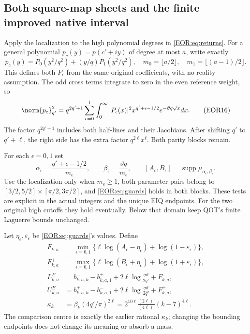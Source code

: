\documentclass[11pt,a4paper]{article}
\begin{document}
\subsection{Both square-map sheets and the finite improved native interval}
\label{EOR:sec:application}
Apply the localization to the high polynomial degrees in \eqref{EOR:eq:returns}.
For a general polynomial $p_c(y)=p(c'+iy)$ of degree at most $a$, write exactly
\begin{equation}
 p_c(y)=P_0(y^2/q^2)+(y/q)P_1(y^2/q^2),\quad
 m_0=\lfloor a/2\rfloor,\quad m_1=\lfloor(a-1)/2\rfloor .
 \label{EOR:eq:parity}
\tag{EOR15}
\end{equation}
This defines both $P_\epsilon$ from the same original coefficients, with no
reality assumption. The odd cross terms integrate to zero in the even reference
weight, so
\begin{equation}
 \norm{p_c}_{q'}^2=q^{2q'+1}\sum_{\epsilon=0}^1
 \int_0^\infty |P_\epsilon(x)|^2
 x^{q'+\epsilon-1/2}e^{-\vartheta q\sqrt x}dx.
 \label{EOR:eq:square}
\tag{EOR16}
\end{equation}
The factor $q^{2q'+1}$ includes both half-lines and their Jacobians.
After shifting $q'$ to $q'+\ell$, the right side has the extra factor
$q^{2\ell}x^\ell$. Both parity blocks remain.

For each $\epsilon=0,1$ set
\begin{equation}
 \alpha_\epsilon=\frac{q'+\epsilon-1/2}{m_\epsilon},\qquad
 \beta_\epsilon=\frac{\vartheta q}{m_\epsilon},\qquad
 [A_\epsilon,B_\epsilon]=\operatorname{supp}\mu_{\alpha_\epsilon,\beta_\epsilon}.
 \label{EOR:eq:parameters}
\tag{EOR17}
\end{equation}
Use the localization only when $m_\epsilon\ge1$, both parameter pairs belong to
$[3/2,5/2]\times[\pi/2,3\pi/2]$, and \eqref{EOR:eq:guards} holds in both blocks.
These tests are explicit in the actual integers and the unique EIQ endpoints.
For the two original high cutoffs they hold eventually. Below that domain keep
QOT's finite Laguerre bounds unchanged.

Let $\eta_\epsilon,\varepsilon_\epsilon$ be \eqref{EOR:eq:guards}'s values. Define
\begin{equation}
\begin{split}
 F_{k,a}^{-}&=\min_{\epsilon=0,1}
  \{\ell\log(A_\epsilon-\eta_\epsilon)+\log(1-\varepsilon_\epsilon)\},\\
 F_{k,a}^{+}&=\max_{\epsilon=0,1}
  \{\ell\log(B_\epsilon+\eta_\epsilon)+\log(1+\varepsilon_\epsilon)\},\\
 L_{k,a}^{E}&=b_{k,a,k}^{-}-b_{k,a,1}^{+}
       +2\ell\log\frac{q\vartheta}{2q'}+F_{k,a}^{-},\\
 U_{k,a}^{E}&=b_{k,a,k}^{+}-b_{k,a,1}^{-}
       +2\ell\log\frac{q\vartheta}{2q'}+F_{k,a}^{+},\\
 \kappa_k&=\beta_k(4q'/\pi)^{2\ell}
          =2^{10\ell}\frac{(2\ell)!}{(4\ell)!}(k-7)^{4\ell}.
\end{split}\label{EOR:eq:newconstants}
\tag{EOR18}
\end{equation}
The comparison centre is exactly the earlier rational $\kappa_k$; changing the
bounding endpoints does not change its meaning or absorb a mass.
\end{document}
